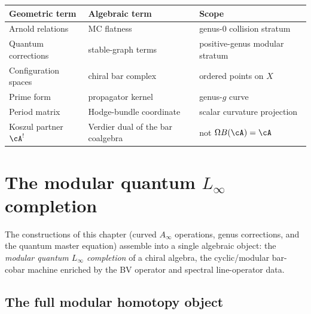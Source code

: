 \begin{center}
\begin{tabular}{lll}
\toprule
Geometric term & Algebraic term & Scope \\
\midrule
Arnold relations & MC flatness & genus-$0$ collision stratum \\
Quantum corrections & stable-graph terms & positive-genus modular stratum \\
Configuration spaces & chiral bar complex & ordered points on $X$ \\
Prime form & propagator kernel & genus-$g$ curve \\
Period matrix & Hodge-bundle coordinate & scalar curvature projection \\
Koszul partner $\cA^!$ & Verdier dual of the bar coalgebra &
not $\Omega B(\cA)=\cA$ \\
\bottomrule
\end{tabular}
\end{center}

\section{The modular quantum \texorpdfstring{$L_\infty$}{L-infinity} completion}
\label{sec:modular-quantum-Linfty}

The constructions of this chapter (curved $A_\infty$ operations, genus
corrections, and the quantum master equation) assemble into a single
algebraic object: the \emph{modular quantum $L_\infty$ completion} of a
chiral algebra, the cyclic/modular bar-cobar machine enriched by
the BV operator and spectral line-operator data.

\subsection{The full modular homotopy object}

